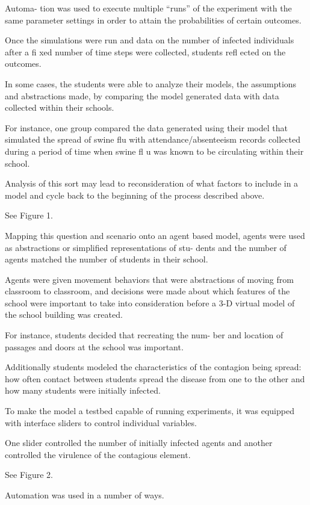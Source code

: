 Automa- tion was used to execute multiple “runs” of the experiment with the same parameter settings in order to attain the probabilities of certain outcomes.

Once the simulations were run and data on the number of infected individuals after a fi xed number of time steps were collected, students refl ected on the outcomes.

In some cases, the students were able to analyze their models, the assumptions and abstractions made, by comparing the model generated data with data collected within their schools.

For instance, one group compared the data generated using their model that simulated the spread of swine flu with attendance/absenteeism records collected during a period of time when swine fl u was known to be circulating within their school.

Analysis of this sort may lead to reconsideration of what factors to include in a model and cycle back to the beginning of the process described above.

See Figure 1.

Mapping this question and scenario onto an agent based model, agents were used as abstractions or simplified representations of stu- dents and the number of agents matched the number of students in their school.

Agents were given movement behaviors that were abstractions of moving from classroom to classroom, and decisions were made about which features of the school were important to take into consideration before a 3-D virtual model of the school building was created.

For instance, students decided that recreating the num- ber and location of passages and doors at the school was important.

Additionally students modeled the characteristics of the contagion being spread: how often contact between students spread the disease from one to the other and how many students were initially infected.

To make the model a testbed capable of running experiments, it was equipped with interface sliders to control individual variables.

One slider controlled the number of initially infected agents and another controlled the virulence of the contagious element.

See Figure 2.

Automation was used in a number of ways.

